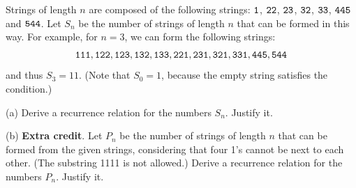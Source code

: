 \documentclass{article}
\begin{document}
\begin{problem}
Strings of length $n$ are composed of the following strings: $\tt1$, $\tt2\tt2$, $\tt2\tt3$, $\tt3\tt2$, $\tt3\tt3$,
$\tt4\tt4\tt5$ and $\tt5\tt4\tt4$. Let $S_n$ be the number of strings of length $n$ that can
be formed in this way. For example, for $n=3$, we can form the following strings:
%
\begin{align*}
\tt1\tt1\tt1
,
\tt1\tt2\tt2  , \tt1\tt2\tt3  , \tt1\tt3\tt2  , \tt1\tt3\tt3
,
\tt2\tt2\tt1  , \tt2\tt3\tt1  , \tt3\tt2\tt1  , \tt3\tt3\tt1 
,
\tt4\tt4\tt5 , \tt5\tt4\tt4
\end{align*}
%
and thus $S_3 = 11$. (Note that $S_0 = 1$, because the
empty string satisfies the condition.)

\smallskip
\noindent (a) Derive a recurrence relation for the numbers $S_n$. Justify it.

\smallskip
\noindent (b) \textbf{Extra credit}. Let $P_n$ be the number of strings of length $n$ that can
be formed from the given strings,  considering that four 1's cannot be next to each other. (The substring 1111 is not allowed.) Derive a recurrence relation for the numbers $P_n$. Justify it.
\smallskip

\end{problem}
\newline
\end{document}
